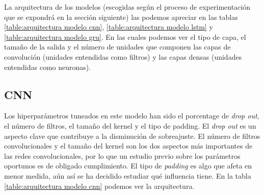         La arquitectura de los modelos (escogidas según el proceso de experimentación que se expondrá en la sección siguiente) las podemos apreciar en las tablas \ref{table:arquitectura modelo cnn}, \ref{table:arquitectura modelo lstm} y \ref{table:arquitectura modelo gru}. En las cuales podemos ver el tipo de capa, el tamaño de la salida y el número de unidades que componen las capas de convolución (unidades entendidas como filtros) y las capas densas (unidades entendidas como neuronas). \\
        
    \subsection{CNN}
        Los hiperparámetros tuneados en este modelo han sido el porcentage de \textit{drop out}, el número de filtros, el tamaño del kernel y el tipo de padding. El \textit{drop out} es un aspecto clave que contribuye a la disminución de sobreajuste. El número de filtros convolucionales y el tamaño del kernel son los dos aspectos más importantes de las redes convolucionales, por lo que un estudio previo sobre los parámetros oportunos es de obligado cumplimiento. El tipo de \textit{padding} es algo que afeta en menor medida, aún así se ha decidido estudiar qué influencia tiene. En la tabla \ref{table:arquitectura modelo cnn} podemos ver la arquitectura. \\
        
